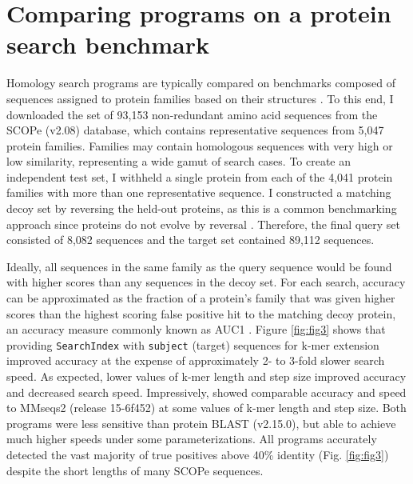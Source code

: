 \section{Comparing programs on a protein search benchmark}\label{comparing-programs-on-a-protein-search-benchmark}

Homology search programs are typically compared on benchmarks composed of sequences assigned to protein families based on their structures \citep{RN4253}. To this end, I downloaded the set of 93,153 non-redundant amino acid sequences from the SCOPe (v2.08) database, which contains representative sequences from 5,047 protein families. Families may contain homologous sequences with very high or low similarity, representing a wide gamut of search cases. To create an independent test set, I withheld a single protein from each of the 4,041 protein families with more than one representative sequence. I constructed a matching decoy set by reversing the held-out proteins, as this is a common benchmarking approach since proteins do not evolve by reversal \citep{RN4221}. Therefore, the final query set consisted of 8,082 sequences and the target set contained 89,112 sequences.

Ideally, all sequences in the same family as the query sequence would be found with higher scores than any sequences in the decoy set. For each search, accuracy can be approximated as the fraction of a protein's family that was given higher scores than the highest scoring false positive hit to the matching decoy protein, an accuracy measure commonly known as AUC1 \citep{RN4223}. Figure \ref{fig:fig3} shows that providing \texttt{SearchIndex} with \texttt{subject} (target) sequences for k-mer extension improved accuracy at the expense of approximately 2- to 3-fold slower search speed. As expected, lower values of k-mer length and step size improved accuracy and decreased search speed. Impressively,  showed comparable accuracy and speed to MMseqs2 (release 15-6f452) at some values of k-mer length and step size. Both programs were less sensitive than protein BLAST (v2.15.0), but able to achieve much higher speeds under some parameterizations. All programs accurately detected the vast majority of true positives above 40\% identity (Fig. \ref{fig:fig3}) despite the short lengths of many SCOPe sequences.

